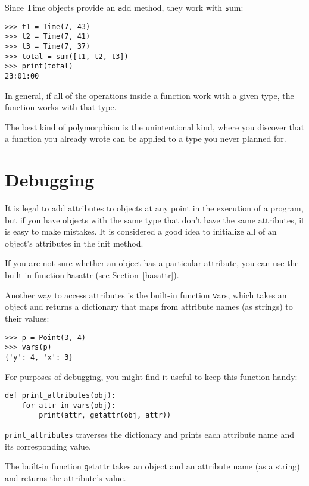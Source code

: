 \documentclass[
DIV=11,
fontsize=12,
twoside,
headinclude=false,
titlepage=firstiscover,
abstract=true,
headsepline=true,
footsepline=true,
chapterprefix=true, %
headings=big,
bibliography=totoc,%
captions=tableheading
]{scrbook}
\theoremstyle{definition}
\begin{document}
Since Time objects provide an {\texttt add} method, they work
with {\texttt sum}:

\begin{lstlisting}
>>> t1 = Time(7, 43)
>>> t2 = Time(7, 41)
>>> t3 = Time(7, 37)
>>> total = sum([t1, t2, t3])
>>> print(total)
23:01:00
\end{lstlisting}
%
In general, if all of the operations inside a function 
work with a given type, the function works with that type.

The best kind of polymorphism is the unintentional kind, where
you discover that a function you already wrote can be
applied to a type you never planned for.


\section{Debugging}

It is legal to add attributes to objects at any point in the execution
of a program, but if you have objects with the same type that don't
have the same attributes, it is easy to make mistakes.
It is considered a good idea to
initialize all of an object's attributes in the init method.

If you are not sure whether an object has a particular attribute, you
can use the built-in function {\texttt hasattr} (see Section~\ref{hasattr}).

Another way to access attributes is the built-in function {\texttt vars},
which takes an object and returns a dictionary that maps from
attribute names (as strings) to their values:

\begin{lstlisting}
>>> p = Point(3, 4)
>>> vars(p)
{'y': 4, 'x': 3}
\end{lstlisting}
%
For purposes of debugging, you might find it useful to keep this
function handy:

\begin{lstlisting}
def print_attributes(obj):
    for attr in vars(obj):
        print(attr, getattr(obj, attr))
\end{lstlisting}
%
\verb"print_attributes" traverses the dictionary
and prints each attribute name and its corresponding value.

The built-in function {\texttt getattr} takes an object and an attribute
name (as a string) and returns the attribute's value.
\end{document}
